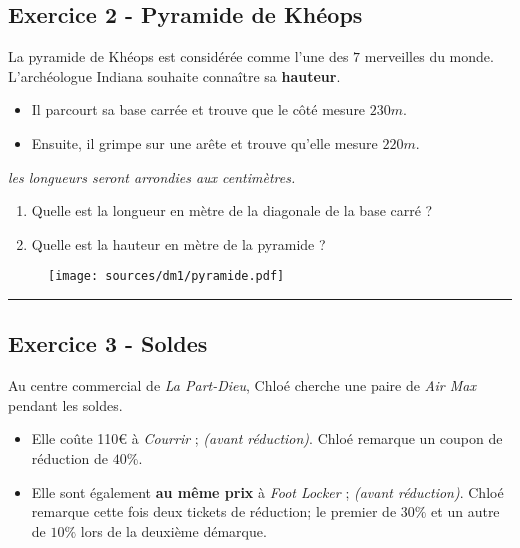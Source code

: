 \documentclass[12pt]{article}
\newcommand{\horrule}[1]{\rule{\linewidth}{#1}} %
\begin{document}
\begin{multicols}{2}

  \subsection*{Exercice 2 - Pyramide de Khéops}

  La pyramide de Khéops est considérée comme l'une des $7$ merveilles du monde.\\ 
  L'archéologue Indiana souhaite connaître sa \textbf{hauteur}.
  \begin{itemize}
  \item Il parcourt sa base carrée et trouve que le côté mesure $230m$.
  \item Ensuite, il grimpe sur une arête et trouve qu'elle mesure $220m$.
  \end{itemize}

  \textit{les longueurs seront arrondies aux centimètres.}
  \begin{enumerate}
  \item[1)] Quelle est la longueur en mètre de la diagonale de la base carré ?
  \item[2)] Quelle est la hauteur en mètre de la pyramide ?
  \end{enumerate}

  \begin{figure}[H]
    \centering
    \texttt{[image: sources/dm1/pyramide.pdf]}
  \end{figure}

\end{multicols}

\horrule{1px}

\subsection*{Exercice 3 - Soldes}

Au centre commercial de \textit{La Part-Dieu}, Chloé cherche une paire de \textit{Air Max} pendant les soldes.\\
\begin{itemize}
\item Elle coûte 110\euro \: à \textit{Courrir} ; \textit{(avant réduction)}. Chloé remarque un coupon de réduction de $40\%$.
\item Elle sont également \textbf{au même prix} à \textit{Foot Locker} ; \textit{(avant réduction)}. Chloé remarque cette fois deux tickets de réduction; le premier de $30\%$ et un autre de $10\%$ lors de la deuxième démarque.\\
\end{itemize}
\end{document}
